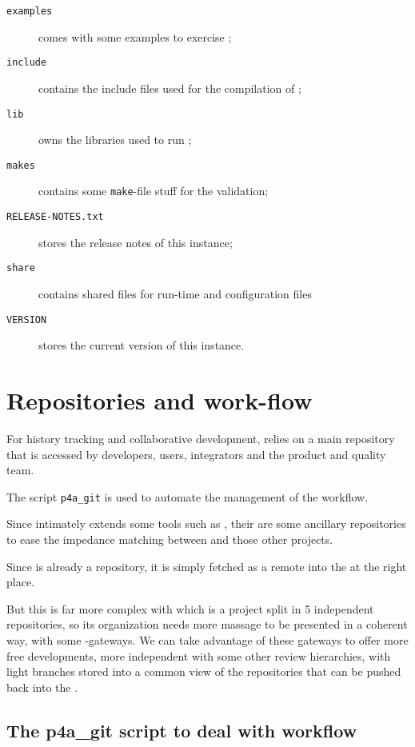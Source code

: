 \documentclass[a4paper]{article}
\begin{document}
\begin{description}
\begin{description}
  \item[\texttt{examples}] comes with some examples to exercise \Apfa;
  \item[\texttt{include}] contains the include files used for the
    compilation of \Apfa;
  \item[\texttt{lib}] owns the libraries used to run \Apfa;
  \item[\texttt{makes}] contains some \texttt{make}-file stuff for the
    \Apips validation;
  \item[\texttt{RELEASE-NOTES.txt}] stores the release notes of this \Apfa
    instance;
  \item[\texttt{share}] contains shared files for run-time and
    configuration files
  \item[\texttt{VERSION}] stores the current version of this \Apfa
    instance.
  \end{description}
\end{description}


\section{Repositories and work-flow}
\label{sec:repos-workfl}

For history tracking and collaborative development, \Apfa relies on a main
\Agit repository that is accessed by \Apfa developers, users, integrators
and the product and quality team.

The script \verb|p4a_git| is used to automate the management of the
workflow.

Since \Apfa intimately extends some tools such as \Apips, their are some
ancillary repositories to ease the impedance matching between \Apfa and
those other projects.

Since \Apolylib is already a \Agit repository, it is simply fetched as a
remote \Agit into the \Apfa at the right place.

But this is far more complex with \Apips which is a project split in 5
independent \Asvn repositories, so its organization needs more massage to
be presented in a coherent way, with some \Asvn-\Agit gateways. We can
take advantage of these gateways to offer more free developments, more
independent with some other review hierarchies, with light branches stored
into a common \Agit view of the \Apips{} \Asvn repositories that can be
pushed back into the \Apips{} \Asvn.


\subsection{The p4a\_git script to deal with workflow}
\label{sec:p4a_git-script-deal}
\end{document}
